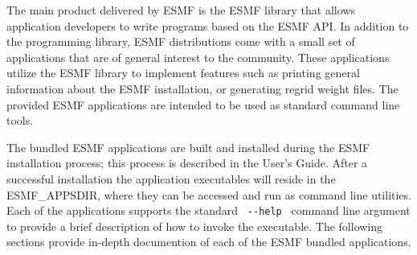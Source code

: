 

The main product delivered by ESMF is the ESMF library that allows application
developers to write programs based on the ESMF API. In addition to the 
programming library, ESMF distributions come with a small set of applications
that are of general interest to the community. These applications utilize
the ESMF library to implement features such as printing general information
about the ESMF installation, or generating regrid weight files. The provided
ESMF applications are intended to be used as standard command line tools.

The bundled ESMF applications are built and installed during the ESMF installation 
process; this process is described in the User's Guide.  After a successful 
installation the application executables will reside in the ESMF\_APPSDIR, 
where they can be accessed and run as command line utilities.  Each of the applications
supports the standard \verb+ --help + command line argument to provide a brief
description of how to invoke the executable.  The following sections provide 
in-depth documention of each of the ESMF bundled applications.





